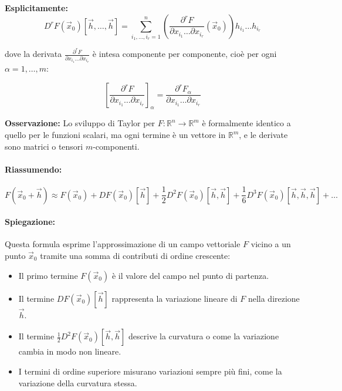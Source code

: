 \documentclass[12pt,a4paper]{article}
\begin{document}
\textbf{Esplicitamente:}
\[
D^r F(\vec{x}_0)[\vec{h}, \dots, \vec{h}] = 
\sum_{i_1, \dots, i_r = 1}^n 
\left( \frac{\partial^r F}{\partial x_{i_1} \dots \partial x_{i_r}} (\vec{x}_0) \right) h_{i_1} \dots h_{i_r}
\]

dove la derivata \( \frac{\partial^r F}{\partial x_{i_1} \dots \partial x_{i_r}} \) è intesa componente per componente, cioè per ogni \( \alpha = 1,\dots,m \):

\[
\left[\frac{\partial^r F}{\partial x_{i_1} \dots \partial x_{i_r}}\right]_\alpha = \frac{\partial^r F_\alpha}{\partial x_{i_1} \dots \partial x_{i_r}}
\]

\textbf{Osservazione:}  
Lo sviluppo di Taylor per \( F : \mathbb{R}^n \to \mathbb{R}^m \) è formalmente identico a quello per le funzioni scalari, ma ogni termine è un vettore in \( \mathbb{R}^m \), e le derivate sono matrici o tensori \( m \)-componenti.

\paragraph{Riassumendo:}

\[
F(\vec{x}_0 + \vec{h}) \approx F(\vec{x}_0) 
+ D F(\vec{x}_0)[\vec{h}] 
+ \frac{1}{2} D^2 F(\vec{x}_0)[\vec{h}, \vec{h}] 
+ \frac{1}{6} D^3 F(\vec{x}_0)[\vec{h}, \vec{h}, \vec{h}] 
+ \ldots
\]

\paragraph{Spiegazione:}

Questa formula esprime l'approssimazione di un campo vettoriale \( F \) vicino a un punto \( \vec{x}_0 \) tramite una somma di contributi di ordine crescente:

\begin{itemize}
    \item Il primo termine \( F(\vec{x}_0) \) è il valore del campo nel punto di partenza.
    \item Il termine \( D F(\vec{x}_0)[\vec{h}] \) rappresenta la variazione lineare di \( F \) nella direzione \( \vec{h} \).
    \item Il termine \( \frac{1}{2} D^2 F(\vec{x}_0)[\vec{h}, \vec{h}] \) descrive la curvatura o come la variazione cambia in modo non lineare.
    \item I termini di ordine superiore misurano variazioni sempre più fini, come la variazione della curvatura stessa.
\end{itemize}
\end{document}
